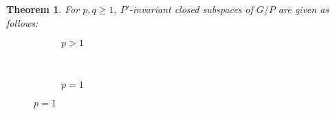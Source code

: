 \documentclass[12pt]{article} %
\newtheorem{theorem}{Theorem}
\theoremstyle{definition}
\theoremstyle{exampstyle} \newtheorem{examp}[theorem]{Theorem}
\begin{document}
\begin{theorem}
For $p, q \geqslant 1$, $P'$-invariant closed subspaces of $G/P$ are given as follows:\\
  \begin{figure}[H]
	  
    \centering
    \begin{subfigure}{0.3\textwidth}
	\caption{$p>1$}
    \end{subfigure}
    ~ %
    \begin{subfigure}{0.3\textwidth}
	\raisebox{40mm}
	{}
	\caption{$p=1$}
    \end{subfigure}
\end{figure}
\end{theorem}
\end{document}
